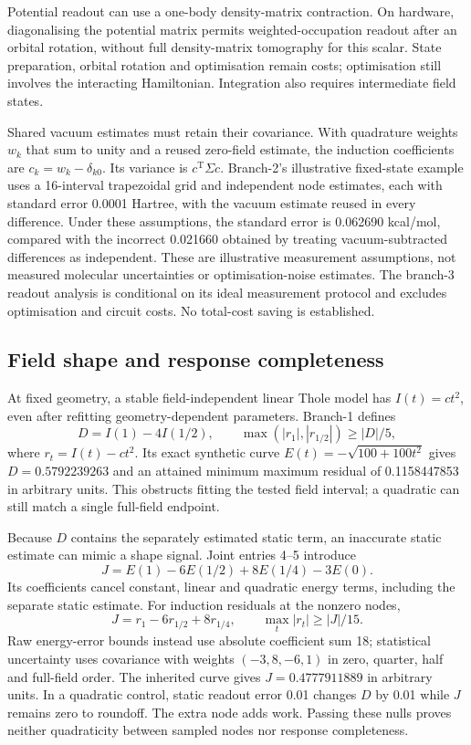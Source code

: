 \documentclass{article}
\begin{document}
Potential readout can use a one-body density-matrix contraction. On hardware, diagonalising the potential matrix permits weighted-occupation readout after an orbital rotation, without full density-matrix tomography for this scalar. State preparation, orbital rotation and optimisation remain costs; optimisation still involves the interacting Hamiltonian. Integration also requires intermediate field states.

Shared vacuum estimates must retain their covariance. With quadrature weights $w_k$ that sum to unity and a reused zero-field estimate, the induction coefficients are $c_k=w_k-\delta_{k0}$. Its variance is $c^{\mathrm T}\Sigma c$. Branch-2's illustrative fixed-state example uses a 16-interval trapezoidal grid and independent node estimates, each with standard error 0.0001 Hartree, with the vacuum estimate reused in every difference. Under these assumptions, the standard error is 0.062690 kcal/mol, compared with the incorrect 0.021660 obtained by treating vacuum-subtracted differences as independent. These are illustrative measurement assumptions, not measured molecular uncertainties or optimisation-noise estimates. The branch-3 readout analysis is conditional on its ideal measurement protocol and excludes optimisation and circuit costs. No total-cost saving is established.

\subsection{Field shape and response completeness}

At fixed geometry, a stable field-independent linear Thole model has $I(t)=ct^2$, even after refitting geometry-dependent parameters. Branch-1 defines
\begin{equation*}
D=I(1)-4I(1/2),\qquad
\max(|r_1|,|r_{1/2}|)\geq |D|/5,
\end{equation*}
where $r_t=I(t)-ct^2$. Its exact synthetic curve $E(t)=-\sqrt{100+100t^2}$ gives $D=0.5792239263$ and an attained minimum maximum residual of 0.1158447853 in arbitrary units. This obstructs fitting the tested field interval; a quadratic can still match a single full-field endpoint.

Because $D$ contains the separately estimated static term, an inaccurate static estimate can mimic a shape signal. Joint entries 4--5 introduce
\begin{equation*}
J=E(1)-6E(1/2)+8E(1/4)-3E(0).
\end{equation*}
Its coefficients cancel constant, linear and quadratic energy terms, including the separate static estimate. For induction residuals at the nonzero nodes,
\begin{equation*}
J=r_1-6r_{1/2}+8r_{1/4},\qquad \max_t|r_t|\geq |J|/15.
\end{equation*}
Raw energy-error bounds instead use absolute coefficient sum 18; statistical uncertainty uses covariance with weights $(-3,8,-6,1)$ in zero, quarter, half and full-field order. The inherited curve gives $J=0.4777911889$ in arbitrary units. In a quadratic control, static readout error 0.01 changes $D$ by 0.01 while $J$ remains zero to roundoff. The extra node adds work. Passing these nulls proves neither quadraticity between sampled nodes nor response completeness.
\end{document}
